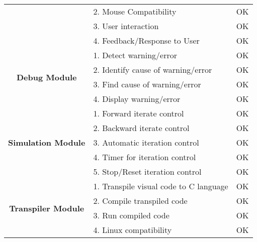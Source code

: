 \begin{longtable}[c]{|c|l|c|}
                                              & 2. Mouse Compatibility                      & OK               \\ \cline{2-3} 
                                              & 3. User interaction                         & OK               \\ \cline{2-3} 
                                              & 4. Feedback/Response to User                & OK               \\ \hline
\multirow{4}{*}{\textbf{Debug Module}}        & 1. Detect warning/error                     & OK               \\ \cline{2-3} 
                                              & 2. Identify cause of warning/error          & OK               \\ \cline{2-3} 
                                              & 3. Find cause of warning/error              & OK               \\ \cline{2-3} 
                                              & 4. Display warning/error                    & OK               \\ \hline
\multirow{5}{*}{\textbf{Simulation Module}}   & 1. Forward iterate control                  & OK               \\ \cline{2-3} 
                                              & 2. Backward iterate control                 & OK               \\ \cline{2-3} 
                                              & 3. Automatic iteration control              & OK               \\ \cline{2-3} 
                                              & 4. Timer for iteration control              & OK               \\ \cline{2-3} 
                                              & 5. Stop/Reset iteration control             & OK               \\ \hline
\multirow{5}{*}{\textbf{Transpiler Module}}   & 1. Transpile visual code to C language      & OK               \\ \cline{2-3} 
                                              & 2. Compile transpiled code                  & OK               \\ \cline{2-3} 
                                              & 3. Run compiled code                        & OK               \\ \cline{2-3} 
                                              & 4. Linux compatibility                      & OK               \\ \cline{2-3} 

\end{longtable}
